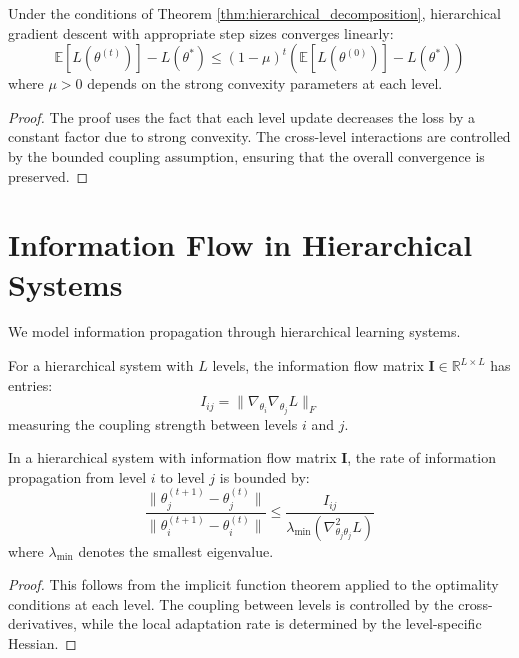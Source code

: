 \begin{theorem}
\label{thm:hierarchical_convergence}
Under the conditions of Theorem \ref{thm:hierarchical_decomposition}, hierarchical gradient descent with appropriate step sizes converges linearly:
$$\mathbb{E}[L(\theta^{(t)})] - L(\theta^*) \leq (1-\mu)^t (\mathbb{E}[L(\theta^{(0)})] - L(\theta^*))$$
where $\mu > 0$ depends on the strong convexity parameters at each level.
\end{theorem}

\begin{proof}
The proof uses the fact that each level update decreases the loss by a constant factor due to strong convexity. The cross-level interactions are controlled by the bounded coupling assumption, ensuring that the overall convergence is preserved.
\end{proof}

\section{Information Flow in Hierarchical Systems}

We model information propagation through hierarchical learning systems.

\begin{definition}
\label{def:information_flow_matrix}
For a hierarchical system with $L$ levels, the information flow matrix $\mathbf{I} \in \mathbb{R}^{L \times L}$ has entries:
$$I_{ij} = \|\nabla_{\theta_i} \nabla_{\theta_j} L\|_F$$
measuring the coupling strength between levels $i$ and $j$.
\end{definition}

\begin{theorem}
\label{thm:information_propagation}
In a hierarchical system with information flow matrix $\mathbf{I}$, the rate of information propagation from level $i$ to level $j$ is bounded by:
$$\frac{\|\theta_j^{(t+1)} - \theta_j^{(t)}\|}{\|\theta_i^{(t+1)} - \theta_i^{(t)}\|} \leq \frac{I_{ij}}{\lambda_{\min}(\nabla^2_{\theta_j \theta_j} L)}$$
where $\lambda_{\min}$ denotes the smallest eigenvalue.
\end{theorem}

\begin{proof}
This follows from the implicit function theorem applied to the optimality conditions at each level. The coupling between levels is controlled by the cross-derivatives, while the local adaptation rate is determined by the level-specific Hessian.
\end{proof}

